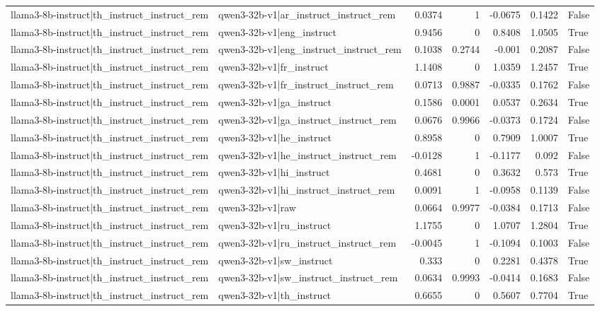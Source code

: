 \begin{table}
\begin{tabular}{l l r r r r l}
llama3-8b-instruct|th_instruct_instruct_rem & qwen3-32b-v1|ar_instruct_instruct_rem & 0.0374 & 1 & -0.0675 & 0.1422 & False \\
llama3-8b-instruct|th_instruct_instruct_rem & qwen3-32b-v1|eng_instruct & 0.9456 & 0 & 0.8408 & 1.0505 & True \\
llama3-8b-instruct|th_instruct_instruct_rem & qwen3-32b-v1|eng_instruct_instruct_rem & 0.1038 & 0.2744 & -0.001 & 0.2087 & False \\
llama3-8b-instruct|th_instruct_instruct_rem & qwen3-32b-v1|fr_instruct & 1.1408 & 0 & 1.0359 & 1.2457 & True \\
llama3-8b-instruct|th_instruct_instruct_rem & qwen3-32b-v1|fr_instruct_instruct_rem & 0.0713 & 0.9887 & -0.0335 & 0.1762 & False \\
llama3-8b-instruct|th_instruct_instruct_rem & qwen3-32b-v1|ga_instruct & 0.1586 & 0.0001 & 0.0537 & 0.2634 & True \\
llama3-8b-instruct|th_instruct_instruct_rem & qwen3-32b-v1|ga_instruct_instruct_rem & 0.0676 & 0.9966 & -0.0373 & 0.1724 & False \\
llama3-8b-instruct|th_instruct_instruct_rem & qwen3-32b-v1|he_instruct & 0.8958 & 0 & 0.7909 & 1.0007 & True \\
llama3-8b-instruct|th_instruct_instruct_rem & qwen3-32b-v1|he_instruct_instruct_rem & -0.0128 & 1 & -0.1177 & 0.092 & False \\
llama3-8b-instruct|th_instruct_instruct_rem & qwen3-32b-v1|hi_instruct & 0.4681 & 0 & 0.3632 & 0.573 & True \\
llama3-8b-instruct|th_instruct_instruct_rem & qwen3-32b-v1|hi_instruct_instruct_rem & 0.0091 & 1 & -0.0958 & 0.1139 & False \\
llama3-8b-instruct|th_instruct_instruct_rem & qwen3-32b-v1|raw & 0.0664 & 0.9977 & -0.0384 & 0.1713 & False \\
llama3-8b-instruct|th_instruct_instruct_rem & qwen3-32b-v1|ru_instruct & 1.1755 & 0 & 1.0707 & 1.2804 & True \\
llama3-8b-instruct|th_instruct_instruct_rem & qwen3-32b-v1|ru_instruct_instruct_rem & -0.0045 & 1 & -0.1094 & 0.1003 & False \\
llama3-8b-instruct|th_instruct_instruct_rem & qwen3-32b-v1|sw_instruct & 0.333 & 0 & 0.2281 & 0.4378 & True \\
llama3-8b-instruct|th_instruct_instruct_rem & qwen3-32b-v1|sw_instruct_instruct_rem & 0.0634 & 0.9993 & -0.0414 & 0.1683 & False \\
llama3-8b-instruct|th_instruct_instruct_rem & qwen3-32b-v1|th_instruct & 0.6655 & 0 & 0.5607 & 0.7704 & True \\

\end{tabular}
\end{table}
